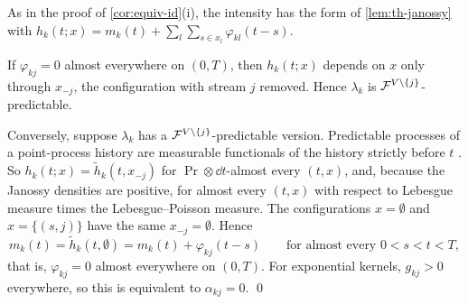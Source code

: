 As in the proof of \cref{cor:equiv-id}(i), the intensity has the form of
\cref{lem:th-janossy} with
$h_k(t;x)=m_k(t)+\sum_l\sum_{s\in x_l}\varphi_{kl}(t-s)$.

If $\varphi_{kj}=0$ almost everywhere on $(0,T)$, then $h_k(t;x)$ depends on $x$ only
through $x_{-j}$, the configuration with stream $j$ removed. Hence $\lambda_k$ is
$\mathcal{F}^{V\setminus\{j\}}$-predictable.

Conversely, suppose $\lambda_k$ has a $\mathcal{F}^{V\setminus\{j\}}$-predictable version.
Predictable processes of a point-process history are measurable functionals of the
history strictly before $t$ \citep[Ch.~14]{daley2008}. So
$h_k(t;x)=\tilde h_k(t,x_{-j})$ for $\Pr\otimes\dd t$-almost every $(t,x)$, and, because the
Janossy densities are positive, for almost every $(t,x)$ with respect to Lebesgue
measure times the Lebesgue--Poisson measure. The configurations $x=\emptyset$ and
$x=\{(s,j)\}$ have the same $x_{-j}=\emptyset$. Hence
\[
m_k(t)=\tilde h_k(t,\emptyset)=m_k(t)+\varphi_{kj}(t-s)\qquad\text{for almost every }0<s<t<T,
\]
that is, $\varphi_{kj}=0$ almost everywhere on $(0,T)$. For exponential kernels,
$g_{kj}>0$ everywhere, so this is equivalent to $\alpha_{kj}=0$. \qed
